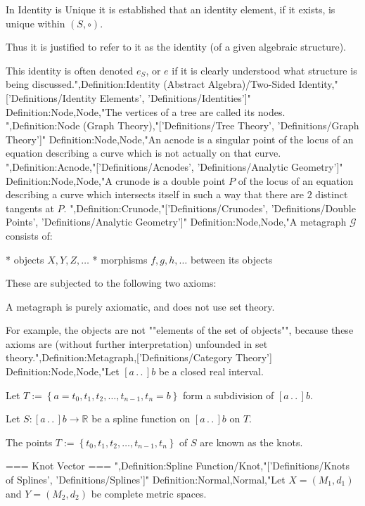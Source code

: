 In Identity is Unique it is established that an identity element, if it exists, is unique within $\left( S, \circ \right)$.

Thus it is justified to refer to it as the identity (of a given algebraic structure).


This identity is often denoted $e_S$, or $e$ if it is clearly understood what structure is being discussed.",Definition:Identity (Abstract Algebra)/Two-Sided Identity,"['Definitions/Identity Elements', 'Definitions/Identities']"
Definition:Node,Node,"The vertices of a tree are called its nodes.
",Definition:Node (Graph Theory),"['Definitions/Tree Theory', 'Definitions/Graph Theory']"
Definition:Node,Node,"An acnode is a singular point of the locus of an equation describing a curve which is not actually on that curve.
",Definition:Acnode,"['Definitions/Acnodes', 'Definitions/Analytic Geometry']"
Definition:Node,Node,"A crunode is a double point $P$ of the locus of an equation describing a curve which intersects itself in such a way that there are $2$ distinct tangents at $P$.
",Definition:Crunode,"['Definitions/Crunodes', 'Definitions/Double Points', 'Definitions/Analytic Geometry']"
Definition:Node,Node,"A metagraph $\mathcal G$ consists of:

* objects $X, Y, Z, \ldots$
* morphisms $f, g, h, \ldots$ between its objects

These are subjected to the following two axioms:







A metagraph is purely axiomatic, and does not use set theory.

For example, the objects are not ""elements of the set of objects"", because these axioms are (without further interpretation) unfounded in set theory.",Definition:Metagraph,['Definitions/Category Theory']
Definition:Node,Node,"Let $\left[ a \,.\,.\,   \right]b$ be a closed real interval.

Let $T := \left\lbrace a = t_0, t_1, t_2, \ldots, t_{n - 1}, t_n = b \right\rbrace$ form a subdivision of $\left[ a \,.\,.\,   \right]b$.

Let $S: \left[ a \,.\,.\,   \right]b \to \mathbb R$ be a spline function on $\left[ a \,.\,.\,   \right]b$ on $T$.


The points $T := \left\lbrace t_0, t_1, t_2, \ldots, t_{n - 1}, t_n \right\rbrace$ of $S$ are known as the knots.


=== Knot Vector ===
",Definition:Spline Function/Knot,"['Definitions/Knots of Splines', 'Definitions/Splines']"
Definition:Normal,Normal,"Let $X = \left( M_1, d_1 \right)$ and $Y = \left( M_2, d_2 \right)$ be complete metric spaces.

